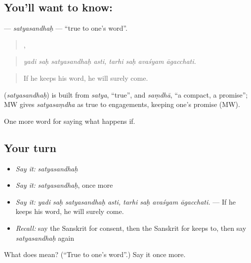 \subsection*{You'll want to know: }
\textbf{} — \emph{satyasandhaḥ} — \textquotedblleft{}true to one's word\textquotedblright{}.

\begin{quote}
   ,    
\end{quote}

\begin{quote}
\emph{yadi saḥ satyasandhaḥ asti, tarhi saḥ avaśyam āgacchati.}
\end{quote}

\begin{quote}
If he keeps his word, he will surely come.
\end{quote}

\begin{cousinweb}
\textbf{} (\emph{satyasandhaḥ}) is built from \emph{satya}, \textquotedblleft{}true\textquotedblright{}, and \emph{saṃdhā}, \textquotedblleft{}a compact, a promise\textquotedblright{}; MW gives \emph{satyasaṃdha} as true to engagements, keeping one's promise (MW).
\end{cousinweb}

\begin{grammarlens}[title={What you've built}]
One more word for saying what happens if.
\end{grammarlens}

\subsection*{Your turn}
\begin{itemize}
\raggedright
  \item \emph{Say it:} \emph{satyasandhaḥ}
  \item \emph{Say it:} \emph{satyasandhaḥ}, once more
  \item \emph{Say it:} \emph{yadi saḥ satyasandhaḥ asti, tarhi saḥ avaśyam āgacchati.} — If he keeps his word, he will surely come.
  \item \emph{Recall:} say the Sanskrit for consent, then the Sanskrit for keeps to, then say \emph{satyasandhaḥ} again
\end{itemize}

\begin{tcolorbox}[breakable,colback=teal!4,colframe=teal!35!black,title={Before you move on}]
What does  mean? (\textquotedblleft{}True to one's word\textquotedblright{}.) Say it once more.
\end{tcolorbox}

